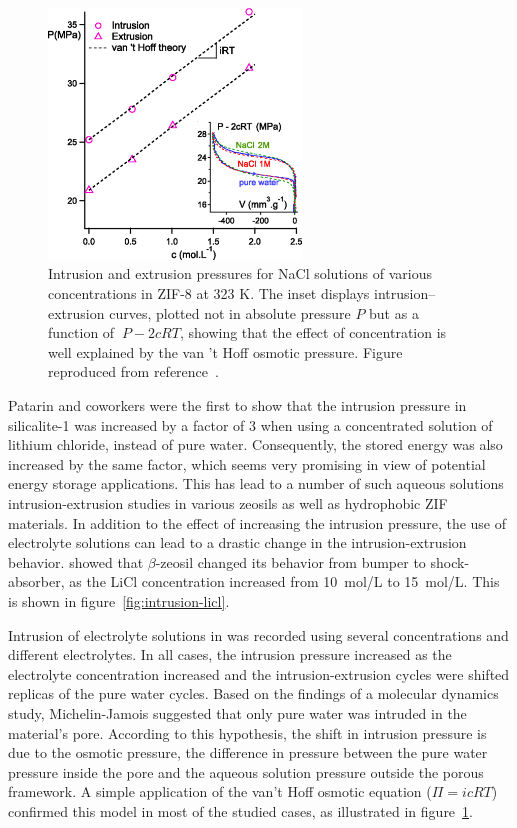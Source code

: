 \documentclass[thesis]{subfiles}
\begin{document}
\begin{figure}[p]
    \centering
    \includegraphics[width=0.6\textwidth]{figures/cited/osmotic-zif}
    \caption{Intrusion and extrusion pressures for NaCl solutions of
    various concentrations in ZIF-8 at 323 K. The inset displays
    intrusion--extrusion curves, plotted not in absolute pressure $P$ but as a
    function of $\ P - 2cRT$, showing that the effect of concentration is well
    explained by the van 't Hoff osmotic pressure. Figure reproduced from
    reference~\cite{MichelinJamois2015}.}
    \label{fig:osmotic-zif}
\end{figure}

Patarin and coworkers\cite{Tzanis2014, Khay2014} were the first to show that the
intrusion pressure in silicalite-1 was increased by a factor of 3 when using a
concentrated solution of lithium chloride, instead of pure water. Consequently,
the stored energy was also increased by the same factor, which seems very
promising in view of potential energy storage applications. This has lead to a
number of such aqueous solutions intrusion-extrusion studies in various zeosils
as well as hydrophobic ZIF materials. In addition to the effect of increasing
the intrusion pressure, the use of electrolyte solutions can lead to a drastic
change in the intrusion-extrusion behavior.
\citeauthor{Ryzhikov2014}\cite{Ryzhikov2014} showed that $\beta$-zeosil changed
its behavior from bumper to shock-absorber, as the LiCl concentration increased
from \SI{10}{mol/L} to \SI{15}{mol/L}. This is shown in
figure~\ref{fig:intrusion-licl}.

Intrusion of electrolyte solutions in  was recorded using several
concentrations and different electrolytes\cite{Ortiz2014, MichelinJamois2015}.
In all cases, the intrusion pressure increased as the electrolyte concentration
increased and the intrusion-extrusion cycles were shifted replicas of the pure
water cycles. Based on the findings of a molecular dynamics study\cite{Hu2011},
Michelin-Jamois suggested that only pure water was intruded in the material's
pore. According to this hypothesis, the shift in intrusion pressure is due to
the osmotic pressure, \ie the difference in pressure between the pure water
pressure inside the pore and the aqueous solution pressure outside the porous
framework. A simple application of the van't Hoff osmotic equation ($\Pi = i c R
T$) confirmed this model in most of the studied cases, as illustrated in
figure~\ref{fig:osmotic-zif}.
\end{document}
